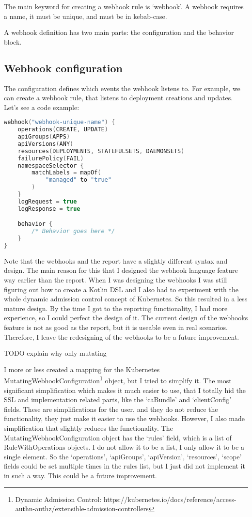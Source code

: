 The main keyword for creating a webhook rule is `webhook'. A webhook requires a name, it must be unique, and must be in kebab-case.

A webhook definition has two main parts: the configuration and the behavior block.

\subsection{Webhook configuration}

The configuration defines which events the webhook listens to. For example, we can create a webhook rule, that listens to deployment creations and updates. Let's see a code example:

\begin{lstlisting}[caption={Webhook configuration},language=Kotlin,label=code:wh_conf]
webhook("webhook-unique-name") {
    operations(CREATE, UPDATE)
    apiGroups(APPS)
    apiVersions(ANY)
    resources(DEPLOYMENTS, STATEFULSETS, DAEMONSETS)
    failurePolicy(FAIL)
    namespaceSelector {
        matchLabels = mapOf(
            "managed" to "true"
        )
    }
    logRequest = true
    logResponse = true

    behavior {
        /* Behavior goes here */
    }
}
\end{lstlisting}

Note that the webhooks and the report have a slightly different syntax and design. The main reason for this that I designed the webhook language feature way earlier than the report. When I was designing the webhooks I was still figuring out how to create a Kotlin DSL and I also had to experiment with the whole dynamic admission control concept of Kubernetes. So this resulted in a less mature design. By the time I got to the reporting functionality, I had more experience, so I could perfect the design of it. The current design of the webhooks feature is not as good as the report, but it is useable even in real scenarios. Therefore, I leave the redesigning of the webhooks to be a future improvement.

TODO explain why only mutating

I more or less created a mapping for the Kubernetes MutatingWebhookConfiguration\footnote{Dynamic Admission Control: https://kubernetes.io/docs/reference/access-authn-authz/extensible-admission-controllers} object, but I tried to simplify it. The most significant simplification which makes it much easier to use, that I totally hid the SSL and implementation related parts, like the `caBundle' and `clientConfig' fields. These are simplifications for the user, and they do not reduce the functionality, they just make it easier to use the webhooks. However, I also made simplification that slightly reduces the functionality. The MutatingWebhookConfiguration object has the `rules' field, which is a list of RuleWithOperations objects. I do not allow it to be a list, I only allow it to be a single element. So the `operations', `apiGroups', `apiVersion', `resources', `scope' fields could be set multiple times in the rules list, but I just did not implement it in such a way. This could be a future improvement.

